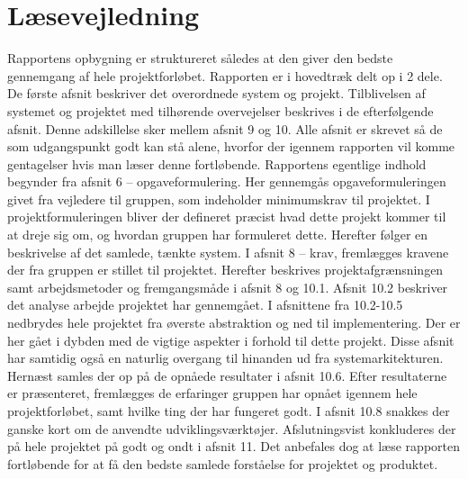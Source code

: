 \section{Læsevejledning}
Rapportens opbygning er struktureret således at den giver den bedste gennemgang af hele projektforløbet. Rapporten er i hovedtræk delt op i 2 dele. De første afsnit beskriver det overordnede system og projekt. Tilblivelsen af systemet og projektet med tilhørende overvejelser beskrives i de efterfølgende afsnit. Denne adskillelse sker mellem afsnit 9 og 10. Alle afsnit er skrevet så de som udgangspunkt godt kan stå alene, hvorfor der igennem rapporten vil komme gentagelser hvis man læser denne fortløbende. Rapportens egentlige indhold begynder fra afsnit 6 – opgaveformulering.  Her gennemgås opgaveformuleringen givet fra vejledere til gruppen, som indeholder minimumskrav til projektet. I projektformuleringen bliver der defineret præcist hvad dette projekt kommer til at dreje sig om, og hvordan gruppen har formuleret dette. Herefter følger en beskrivelse af det samlede, tænkte system.
I afsnit 8 – krav, fremlægges kravene der fra gruppen er stillet til projektet. Herefter beskrives projektafgrænsningen samt arbejdsmetoder og fremgangsmåde i afsnit 8 og 10.1.
Afsnit 10.2 beskriver det analyse arbejde projektet har gennemgået. I afsnittene fra 10.2-10.5 nedbrydes hele projektet fra øverste abstraktion og ned til implementering. Der er her gået i dybden med de vigtige aspekter i forhold til dette projekt. Disse afsnit har samtidig også en naturlig overgang til hinanden ud fra systemarkitekturen. 
Hernæst samles der op på de opnåede resultater i afsnit 10.6. Efter resultaterne er præsenteret, fremlægges de erfaringer gruppen har opnået igennem hele projektforløbet, samt hvilke ting der har fungeret godt. I afsnit 10.8 snakkes der ganske kort om de anvendte udviklingsværktøjer. Afslutningsvist konkluderes der på hele projektet på godt og ondt i afsnit 11. Det anbefales dog at læse rapporten fortløbende for at få den bedste samlede forståelse for projektet og produktet.
